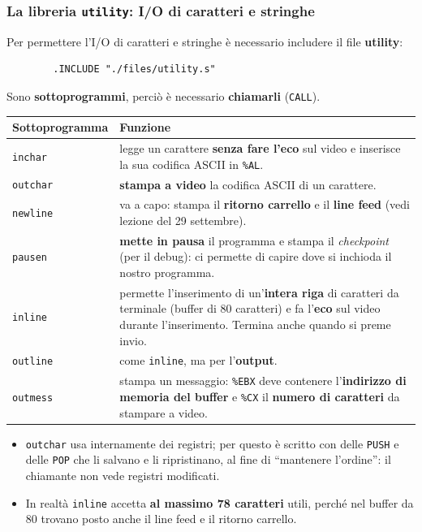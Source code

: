 \documentclass[11pt,a4paper]{article}
\newcommand{\reg}[1]{\texttt{\%#1}}
\begin{document}
\subsubsection*{La libreria \texttt{utility}: I/O di caratteri e stringhe}

Per permettere l'I/O di caratteri e stringhe è necessario includere il file \textbf{utility}:
\begin{lstlisting}
        .INCLUDE "./files/utility.s"
\end{lstlisting}

\begin{nota}
Sono \textbf{sottoprogrammi}, perciò è necessario \textbf{chiamarli} (\texttt{CALL}).
\end{nota}

\begin{center}
\begin{tabular}{l p{11cm}}
\textbf{Sottoprogramma} & \textbf{Funzione} \\ \hline
\texttt{inchar} & legge un carattere \textbf{senza fare l'eco} sul video e inserisce la sua codifica ASCII in \reg{AL}. \\
\texttt{outchar} & \textbf{stampa a video} la codifica ASCII di un carattere. \\
\texttt{newline} & va a capo: stampa il \textbf{ritorno carrello} e il \textbf{line feed} (vedi lezione del 29 settembre). \\
\texttt{pausen} & \textbf{mette in pausa} il programma e stampa il \emph{checkpoint} (per il debug): ci permette di capire dove si inchioda il nostro programma. \\
\texttt{inline} & permette l'inserimento di un'\textbf{intera riga} di caratteri da terminale (buffer di 80 caratteri) e fa l'\textbf{eco} sul video durante l'inserimento. Termina anche quando si preme invio. \\
\texttt{outline} & come \texttt{inline}, ma per l'\textbf{output}. \\
\texttt{outmess} & stampa un messaggio: \reg{EBX} deve contenere l'\textbf{indirizzo di memoria del buffer} e \reg{CX} il \textbf{numero di caratteri} da stampare a video. \\
\end{tabular}
\end{center}

\begin{nota}
\begin{itemize}[leftmargin=*]
  \item \texttt{outchar} usa internamente dei registri; per questo è scritto con delle \texttt{PUSH} e delle \texttt{POP} che li salvano e li ripristinano, al fine di ``mantenere l'ordine'': il chiamante non vede registri modificati.
  \item In realtà \texttt{inline} accetta \textbf{al massimo 78 caratteri} utili, perché nel buffer da 80 trovano posto anche il line feed e il ritorno carrello.
\end{itemize}
\end{nota}
\end{document}
